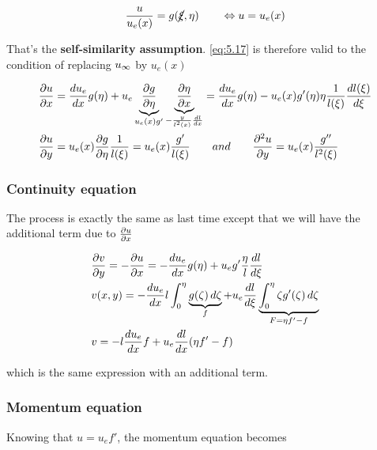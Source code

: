 	\begin{equation}
		\frac{u}{u_e(x)} = g(\cancel{\xi}, \eta)  \qquad \Leftrightarrow u = u_e(x)
	\end{equation}
	
	That's the \textbf{self-similarity assumption}. \eqref{eq:5.17} is therefore valid to the condition of replacing $u_\infty$ by $u_e(x)$
	
	\begin{equation}
		\begin{aligned}
			&\frac{\partial u}{\partial x} = \frac{du_e}{dx}g(\eta ) + u_e\underbrace{\frac{\partial g}{\partial \eta}}_{u_e(x) g'} \underbrace{\frac{\partial \eta}{\partial x}}_{-\frac{y}{l^2(x)}\frac{dl}{dx}} = \frac{du_e}{dx}g(\eta )  - u_e(x) g'(\eta)\eta \frac{1}{l(\xi)} \frac{dl(\xi)}{d\xi}\\
			&\frac{\partial u}{\partial y} = u_e(x)\frac{\partial  g}{\partial \eta} \frac{1}{l(\xi)} = u_e(x) \frac{g'}{l(\xi)} \qquad and \qquad \frac{\partial ^2 u}{\partial y }= u_e(x) \frac{g''}{l^2(\xi)}
		\end{aligned}
		\end{equation}
		
		\subsubsection{Continuity equation}
			The process is exactly the same as last time except that we will have the additional term due to $\frac{\partial u}{\partial x}$ 
			
			\begin{equation}
			\begin{aligned}
				&\frac{\partial v}{\partial y} = -\frac{\partial u}{\partial x} = -\frac{du_e}{dx}g(\eta )  + u_e g'\frac{\eta}{l} \frac{dl}{d\xi} \\
				&v(x,y) = -\frac{du_e}{dx} l \int _0 ^\eta \underbrace{g(\zeta) \, d\zeta }_{f}+ u_e \frac{dl}{d\xi} \underbrace{\int _0 ^\eta \zeta g'(\zeta) \, d\zeta}_{F= \eta f' -f} \\
				&v = -l \frac{du_e}{dx} f + u_e \frac{dl}{dx} (\eta f' - f)
			\end{aligned}
			\end{equation}
			
			which is the same expression with an additional term. 
			
		\subsubsection{Momentum equation}
			Knowing that $u = u_e f'$, the momentum equation becomes
				
